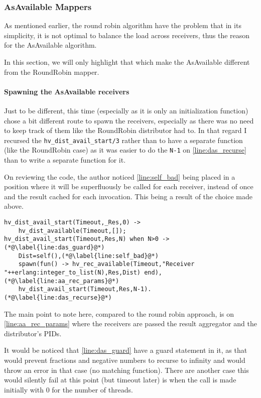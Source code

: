 \subsubsection{AsAvailable Mappers}

As mentioned earlier, the round robin algorithm have the
problem that in its simplicity, it is not optimal to balance the load
across receivers, thus the reason for the AsAvailable algorithm. 

In this section, we will only highlight that which make the
AsAvailable different from the RoundRobin mapper. 

\paragraph{Spawning the AsAvailable receivers}

Just to be different, this time (especially as it is only an
initialization function) chose a bit different route to spawn the
receivers, especially as there was no need to keep track of them like
the RoundRobin distributor had to. In that regard I recursed the
\texttt{hv\_dist\_avail\_start/3} rather than to have a separate
function (like the RoundRobin case) as it was easier to do the
\texttt{N-1} on \autoref{line:das_recurse} than to write a separate
function for it.

 On reviewing the code, the author noticed 
\autoref{line:self_bad} being placed in a position where it will be
superfluously be called for each receiver, instead of once and the
result cached for each invocation. This being a result of the choice
made above.


\begin{lstlisting}[name=hvp2]
%Start the receivers and the distributor
hv_dist_avail_start(Timeout,_Res,0)	->
	hv_dist_available(Timeout,[]);
hv_dist_avail_start(Timeout,Res,N) when N>0 ->(*@\label{line:das_guard}@*)
	Dist=self(),(*@\label{line:self_bad}@*)
	spawn(fun() -> hv_rec_available(Timeout,"Receiver "++erlang:integer_to_list(N),Res,Dist) end),(*@\label{line:aa_rec_params}@*)
	hv_dist_avail_start(Timeout,Res,N-1).(*@\label{line:das_recurse}@*)
\end{lstlisting}

The main point to note here, compared to the round robin approach, is
on \autoref{line:aa_rec_params} where the receivers are passed the
result aggregator and the distributor's PIDs.

It would be noticed that \autoref{line:das_guard} have a guard
statement in it, as that would prevent fractions and negative numbers
to recurse to infinity and would  throw an error in that case
(no matching function). There are another case this would silently
fail at this point (but
timeout later) is when the call is made initially with 0 for the
number of threads.

